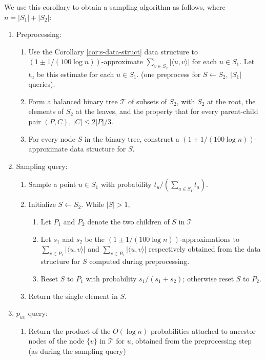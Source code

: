 We use this corollary to obtain a sampling algorithm as follows, where $n = |S_1| + |S_2|$:

\begin{enumerate}
    \item Preprocessing:
    \begin{enumerate}
        \item Use the Corollary \ref{cor:s-data-struct} data structure to $(1 \pm 1/(100\log n))$-approximate $\sum_{v\in S_2} |\langle u,v\rangle|$ for each $u\in S_1$. Let $t_u$ be this estimate for each $u\in S_1$. (one preprocess for $S\gets S_2$, $|S_1|$ queries).
        \item Form a balanced binary tree $\mathcal T$ of subsets of $S_2$, with $S_2$ at the root, the elements of $S_2$ at the leaves, and the property that for every parent-child pair $(P,C)$, $|C|\le 2|P|/3$.
        \item For every node $S$ in the binary tree, construct a $(1 \pm 1/(100\log n))$-approximate data structure for $S$.
    \end{enumerate}
    \item Sampling query:
    \begin{enumerate}
        \item Sample a point $u\in S_1$ with probability $t_u/(\sum_{a\in S_1} t_a)$.
        \item Initialize $S\gets S_2$. While $|S| > 1$,
        \begin{enumerate}
            \item Let $P_1$ and $P_2$ denote the two children of $S$ in $\mathcal T$
            \item Let $s_1$ and $s_2$ be the $(1 \pm 1/(100\log n))$-approximations to $\sum_{v\in P_1} |\langle u,v\rangle|$ and $\sum_{v\in P_2} |\langle u,v\rangle|$ respectively obtained from the data structure for $S$ computed during preprocessing.
            \item Reset $S$ to $P_1$ with probability $s_1/(s_1 + s_2)$; otherwise reset $S$ to $P_2$.
        \end{enumerate}
        \item Return the single element in $S$.
    \end{enumerate}
    \item $p_{uv}$ query:
    \begin{enumerate}
        \item Return the product of the $O(\log n)$ probabilities attached to ancestor nodes of the node $\{v\}$ in $\mathcal T$ for $u$, obtained from the preprocessing step (as during the sampling query)
    \end{enumerate}
\end{enumerate}


